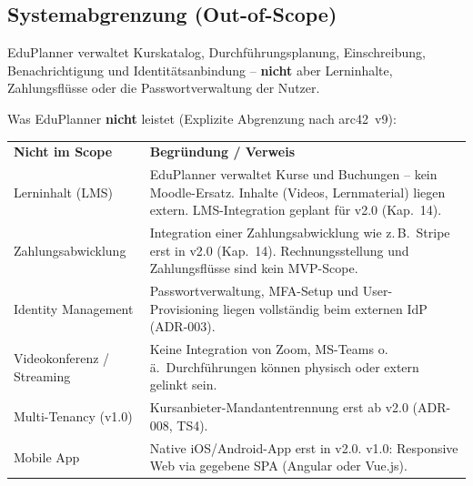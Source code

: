 \subsection{Systemabgrenzung (Out-of-Scope)}

\begin{reviewbox}
EduPlanner verwaltet Kurskatalog, Durchführungsplanung, Einschreibung,
Benachrichtigung und Identitätsanbindung -- \textbf{nicht} aber
Lerninhalte, Zahlungsflüsse oder die Passwortverwaltung der Nutzer.
\end{reviewbox}

Was EduPlanner \textbf{nicht} leistet (Explizite Abgrenzung nach arc42~v9):

\begin{tabularx}{\textwidth}{L{4cm} X}
  \color{white}\textbf{Nicht im Scope} &
  \color{white}\textbf{Begründung / Verweis} \\

  Lerninhalt (LMS) &
  EduPlanner verwaltet Kurse und Buchungen -- kein
  Moodle-Ersatz. Inhalte (Videos, Lernmaterial) liegen
  extern. LMS-Integration geplant für v2.0
  (Kap.~14). \\

  Zahlungsabwicklung &
  Integration einer Zahlungsabwicklung wie z.\,B.\ Stripe
  erst in v2.0 (Kap.~14). Rechnungsstellung und
  Zahlungsflüsse sind kein MVP-Scope. \\

  Identity Management &
  Passwortverwaltung, MFA-Setup\footnotemark{} und
  User-Provisioning liegen vollständig beim externen
  IdP (ADR-003). \\

  Videokonferenz / Streaming &
  Keine Integration von Zoom, MS-Teams o.\,ä.\
  Durchführungen können physisch oder extern gelinkt
  sein. \\

  Multi-Tenancy (v1.0) &
  Kursanbieter-Mandantentrennung erst ab v2.0
  (ADR-008, TS4). \\

  Mobile App &
  Native iOS/Android-App erst in v2.0. v1.0: Responsive
  Web via gegebene SPA (Angular oder Vue.js). \\
\end{tabularx}


